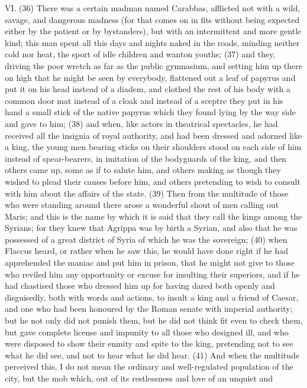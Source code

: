 VI. (36) There was a certain madman named Carabbas, afflicted not with a wild, savage, and
dangerous madness (for that comes on in fits without being expected either by the patient or by
bystanders), but with an intermittent and more gentle kind; this man spent all this days and nights
naked in the roads, minding neither cold nor heat, the sport of idle children and wanton youths; (37)
and they, driving the poor wretch as far as the public gymnasium, and setting him up there on high
that he might be seen by everybody, flattened out a leaf of papyrus and put it on his head instead
of a diadem, and clothed the rest of his body with a common door mat instead of a cloak and
instead of a sceptre they put in his hand a small stick of the native papyrus which they found lying
by the way side and gave to him; (38) and when, like actors in theatrical spectacles, he had
received all the insignia of royal authority, and had been dressed and adorned like a king, the
young men bearing sticks on their shoulders stood on each side of him instead of spear-bearers,
in imitation of the bodyguards of the king, and then others came up, some as if to salute him, and
others making as though they wished to plead their causes before him, and others pretending to
wish to consult with him about the affairs of the state. (39) Then from the multitude of those who
were standing around there arose a wonderful shout of men calling out Maris; and this is the name
by which it is said that they call the kings among the Syrians; for they knew that Agrippa was by
birth a Syrian, and also that he was possessed of a great district of Syria of which he was the
sovereign; (40) when Flaccus heard, or rather when he saw this, he would have done right if he
had apprehended the maniac and put him in prison, that he might not give to those who reviled him
any opportunity or excuse for insulting their superiors, and if he had chastised those who dressed
him up for having dared both openly and disguisedly, both with words and actions, to insult a king
and a friend of Caesar, and one who had been honoured by the Roman senate with imperial
authority; but he not only did not punish them, but he did not think fit even to check them, but gave
complete license and impunity to all those who designed ill, and who were disposed to show their
enmity and spite to the king, pretending not to see what he did see, and not to hear what he did
hear. (41) And when the multitude perceived this, I do not mean the ordinary and well-regulated
population of the city, but the mob which, out of its restlessness and love of an unquiet and

